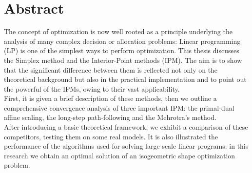 \documentclass[a4paper,10 pt,titlepage,twoside]{book}
\theoremstyle{plain}
\theoremstyle{definition}
\theoremstyle{remark}
\begin{document}
\chapter*{Abstract}
The concept of optimization is now well rooted as a principle underlying the analysis
of many complex decision or allocation problems: Linear programming (LP) is one of the simplest ways to perform optimization.
This thesis discusses the Simplex method and the Interior-Point methods (IPM).
The aim is to show that the significant difference between them is reflected not only on the theoretical background but also in the practical implementation and to point out the powerful of the IPMs, owing to their vast applicability.\\
First, it is given a brief description of these methods,
then we outline a comprehensive convergence analysis of three important IPM: the primal-dual affine scaling, the long-step path-following and the Mehrotra's method. \\
After introducing a basic theoretical framework, we exhibit a comparison of these competitors, testing them on some real models.
It is also illustrated the performance of the algorithms used for solving large scale linear programs: in this research we obtain an optimal solution of an isogeometric shape optimization problem.\\

\end{document}
